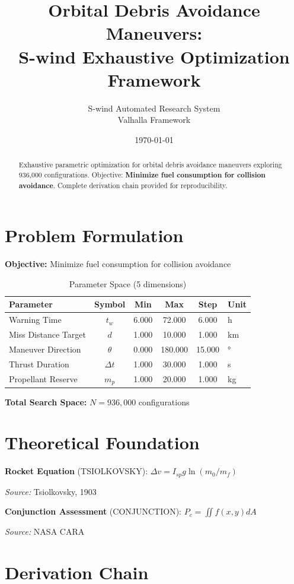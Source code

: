 \documentclass[11pt,twocolumn]{article}
\title{Orbital Debris Avoidance Maneuvers: \\S-wind Exhaustive Optimization Framework}
\author{S-wind Automated Research System\\Valhalla Framework}
\date{\today}
\begin{document}
\maketitle

\begin{abstract}
Exhaustive parametric optimization for orbital debris avoidance maneuvers exploring 936,000 configurations.
Objective: \textbf{Minimize fuel consumption for collision avoidance}.
Complete derivation chain provided for reproducibility.
\end{abstract}

\section{Problem Formulation}
\textbf{Objective:} Minimize fuel consumption for collision avoidance

\begin{table}[h]
\centering
\caption{Parameter Space (5 dimensions)}
\begin{tabular}{@{}lccccl@{}}
\toprule
Parameter & Symbol & Min & Max & Step & Unit \\
\midrule
Warning Time & $t_w$ & 6.000 & 72.000 & 6.000 & h \\
Miss Distance Target & $d$ & 1.000 & 10.000 & 1.000 & km \\
Maneuver Direction & $\theta$ & 0.000 & 180.000 & 15.000 & ° \\
Thrust Duration & $\Delta t$ & 1.000 & 30.000 & 1.000 & s \\
Propellant Reserve & $m_p$ & 1.000 & 20.000 & 1.000 & kg \\
\bottomrule
\end{tabular}
\end{table}

\textbf{Total Search Space:} $N = 936,000$ configurations

\section{Theoretical Foundation}
\textbf{Rocket Equation} (TSIOLKOVSKY): $\Delta v = I_{sp} g \ln(m_0/m_f)$

\textit{Source:} Tsiolkovsky, 1903

\textbf{Conjunction Assessment} (CONJUNCTION): $P_c = \iint f(x,y) dA$

\textit{Source:} NASA CARA


\section{Derivation Chain}
\end{document}
